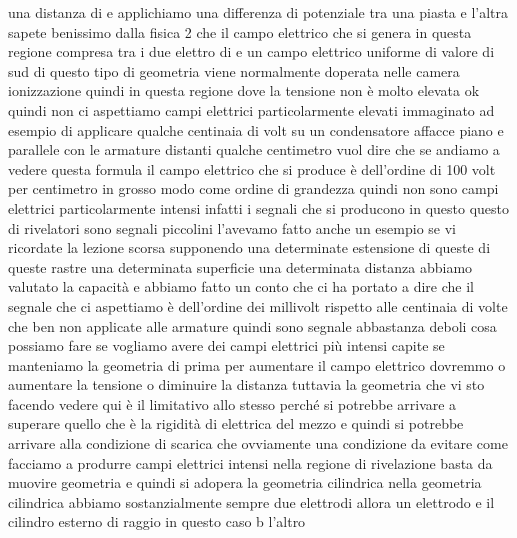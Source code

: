 una distanza di e applichiamo una differenza di potenziale tra una piasta e l'altra sapete benissimo dalla fisica 2 che il campo elettrico che si genera in questa regione compresa tra i due elettro di e un campo elettrico uniforme di valore di sud di questo tipo di geometria viene normalmente doperata nelle camera ionizzazione quindi in questa regione dove la tensione non è molto elevata ok quindi non ci aspettiamo campi elettrici particolarmente elevati immaginato ad esempio di applicare qualche centinaia di volt su un condensatore affacce piano e parallele con le armature distanti qualche centimetro vuol dire che se andiamo a vedere questa formula il campo elettrico che si produce è dell'ordine di 100 volt per centimetro in grosso modo come ordine di grandezza quindi non sono campi elettrici particolarmente intensi infatti i segnali che si producono in questo questo di rivelatori sono segnali piccolini l'avevamo fatto anche un esempio se vi ricordate la lezione scorsa supponendo una determinate estensione di queste di queste rastre una determinata superficie una determinata distanza abbiamo valutato la capacità e abbiamo fatto un conto che ci ha portato a dire che il segnale che ci aspettiamo è dell'ordine dei millivolt rispetto alle centinaia di volte che ben non applicate alle armature quindi sono segnale abbastanza deboli cosa possiamo fare se vogliamo avere dei campi elettrici più intensi capite se manteniamo la geometria di prima per aumentare il campo elettrico dovremmo o aumentare la tensione o diminuire la distanza tuttavia la geometria che vi sto facendo vedere qui è il limitativo allo stesso perché si potrebbe arrivare a superare quello che è la rigidità di elettrica del mezzo e quindi si potrebbe arrivare alla condizione di scarica che ovviamente una condizione da evitare come facciamo a produrre campi elettrici intensi nella regione di rivelazione basta da muovire geometria e quindi si adopera la geometria cilindrica nella geometria cilindrica abbiamo sostanzialmente sempre due elettrodi allora un elettrodo e il cilindro esterno di raggio in questo caso b l'altro

